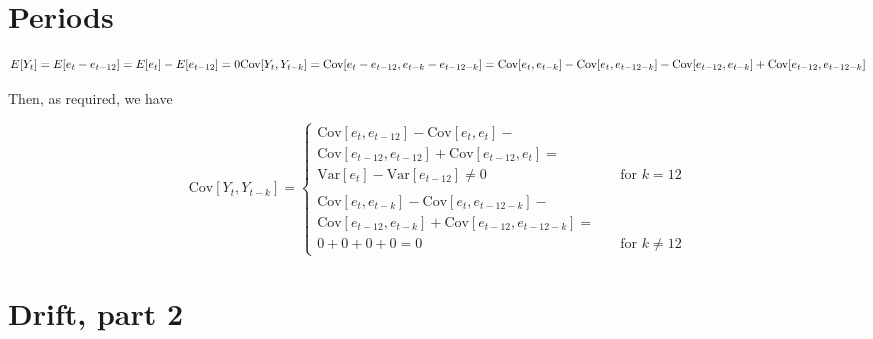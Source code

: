 \documentclass[]{book}
\begin{document}
\section{Periods}\label{periods}

\[
  E[Y_t] = E[e_t - e_{t-12}] = E[e_t] - E[e_{t-12}] = 0\\
  \text{Cov}[Y_t, Y_{t-k}] = \text{Cov}[e_t - e_{t-12}, e_{t-k} - e_{t-12-k}] =\\
  \text{Cov}[e_t, e_{t-k}] - \text{Cov}[e_t, e_{t-12-k}] - \text{Cov}[e_{t-12}, e_{t-k}] + \text{Cov}[e_{t-12}, e_{t-12-k}]
\]

Then, as required, we have

\[ \text{Cov}[Y_t, Y_{t-k}] =
  \begin{cases}
    \text{Cov}[e_t, e_{t-12}] - \text{Cov}[e_t, e_t] -\\ \text{Cov}[e_{t-12}, e_{t-12}] + \text{Cov}[e_{t-12},e_t] =\\
      \text{Var}[e_t] - \text{Var}[e_{t-12}] \neq 0 & \quad \text{for }  k=12\\
      \\
    \text{Cov}[e_t, e_{t-k}] - \text{Cov}[e_t, e_{t-12-k}] -\\ \text{Cov}[e_{t-12}, e_{t-k}] + \text{Cov}[e_{t-12}, e_{t-12-k}] =\\
    0 + 0 + 0 + 0 = 0 & \quad \text{for } k \neq 12
  \end{cases}
\]

\section{Drift, part 2}\label{drift-part-2}
\end{document}
